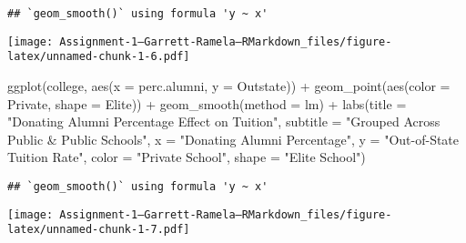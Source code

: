 \documentclass[
]{article}
\newenvironment{Shaded}{\begin{snugshade}}{\end{snugshade}}
\newcommand{\AttributeTok}[1]{\textcolor[rgb]{0.77,0.63,0.00}{#1}}
\newcommand{\FunctionTok}[1]{\textcolor[rgb]{0.00,0.00,0.00}{#1}}
\newcommand{\NormalTok}[1]{#1}
\newcommand{\SpecialCharTok}[1]{\textcolor[rgb]{0.00,0.00,0.00}{#1}}
\newcommand{\StringTok}[1]{\textcolor[rgb]{0.31,0.60,0.02}{#1}}
\begin{document}
\begin{verbatim}
## `geom_smooth()` using formula 'y ~ x'
\end{verbatim}

\texttt{[image: Assignment-1---Garrett-Ramela---RMarkdown\_files/figure-latex/unnamed-chunk-1-6.pdf]}

\begin{Shaded}
\begin{Highlighting}[]
\FunctionTok{ggplot}\NormalTok{(college, }\FunctionTok{aes}\NormalTok{(}\AttributeTok{x =}\NormalTok{ perc.alumni, }\AttributeTok{y =}\NormalTok{ Outstate)) }\SpecialCharTok{+}
  \FunctionTok{geom\_point}\NormalTok{(}\FunctionTok{aes}\NormalTok{(}\AttributeTok{color =}\NormalTok{ Private, }\AttributeTok{shape =}\NormalTok{ Elite)) }\SpecialCharTok{+}
  \FunctionTok{geom\_smooth}\NormalTok{(}\AttributeTok{method =}\NormalTok{ lm) }\SpecialCharTok{+}
  \FunctionTok{labs}\NormalTok{(}\AttributeTok{title =} \StringTok{"Donating Alumni Percentage Effect on Tuition"}\NormalTok{,}
       \AttributeTok{subtitle =} \StringTok{"Grouped Across Public \& Public Schools"}\NormalTok{,}
       \AttributeTok{x =} \StringTok{"Donating Alumni Percentage"}\NormalTok{,}
       \AttributeTok{y =} \StringTok{"Out{-}of{-}State Tuition Rate"}\NormalTok{,}
       \AttributeTok{color =} \StringTok{"Private School"}\NormalTok{,}
       \AttributeTok{shape =} \StringTok{"Elite School"}\NormalTok{)}
\end{Highlighting}
\end{Shaded}

\begin{verbatim}
## `geom_smooth()` using formula 'y ~ x'
\end{verbatim}

\texttt{[image: Assignment-1---Garrett-Ramela---RMarkdown\_files/figure-latex/unnamed-chunk-1-7.pdf]}
\end{document}

